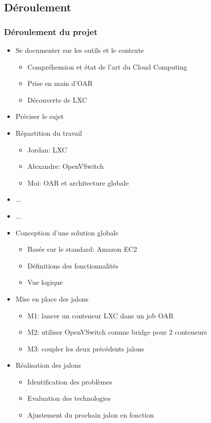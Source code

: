 \documentclass{beamer}
\begin{document}
		\subsection{Déroulement}
			\begin{frame}
			  \frametitle{Déroulement du projet}
			  \begin{itemize}
			    \item Se documenter sur les outils et le contexte
			    \begin{itemize}
			      \item Compréhension et état de l'art du Cloud Computing
			      \item Prise en main d'OAR
			      \item Découverte de LXC
			    \end{itemize}
			    \item Préciser le sujet
			    \item Répartition du travail
			    \begin{itemize}
			      \item Jordan: LXC
            \item Alexandre: OpenVSwitch
            \item Moi: OAR et architecture globale
			    \end{itemize}
			    \item ...
			  \end{itemize}
			\end{frame}
			\begin{frame}
			  \begin{itemize}
			    \item ...
			    \item Conception d'une solution globale
			    \begin{itemize}
			      \item Basée sur le standard: Amazon EC2
            \item Définitions des fonctionnalités
            \item Vue logique
			    \end{itemize}
			    \item Mise en place des jalons
			    \begin{itemize}
			      \item M1: lancer un conteneur LXC dans un job OAR
            \item M2: utiliser OpenVSwitch comme bridge pour 2 conteneurs
            \item M3: coupler les deux précédents jalons
			    \end{itemize}
			    \item Réalisation des jalons
			    \begin{itemize}
			      \item Identification des problèmes
            \item Evaluation des technologies
            \item Ajustement du prochain jalon en fonction
			    \end{itemize}
			  \end{itemize}
			\end{frame}
			
\end{document}
